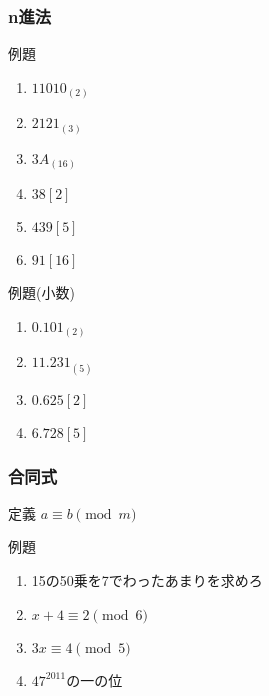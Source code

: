 \documentclass[10pt,dvipdfmx]{jsarticle}
\begin{document}
\subsubsection*{n進法}
\begin{itembox}[l]{例題}
  \begin{multicols}{2}
    \begin{large}
      \begin{enumerate}
        \item $11010_{(2)}$
        \item $2121_{(3)}$
        \item $3A_{(16)}$
        \item $38 [2]$
        \item $439 [5]$
        \item $91 [16]$
      \end{enumerate}
    \end{large}
  \end{multicols}
\end{itembox}
\begin{itembox}[l]{例題(小数)}
  \begin{multicols}{2}
    \begin{large}
      \begin{enumerate}
        \item $0.101_{(2)}$
        \item $11.231_{(5)}$
        \item $0.625[2]$
        \item $6.728[5]$
      \end{enumerate}
    \end{large}
  \end{multicols}
\end{itembox}

\subsubsection*{合同式}
定義 $a\equiv b \pmod m$
\begin{itembox}[l]{例題}
  \begin{large}
    \begin{enumerate}
      \item 15の50乗を7でわったあまりを求めろ
      \item $x+4\equiv 2\pmod 6$
      \item $3x\equiv 4 \pmod 5$
      \item $47^2011$の一の位
    \end{enumerate}
  \end{large}
\end{itembox}
\end{document}
